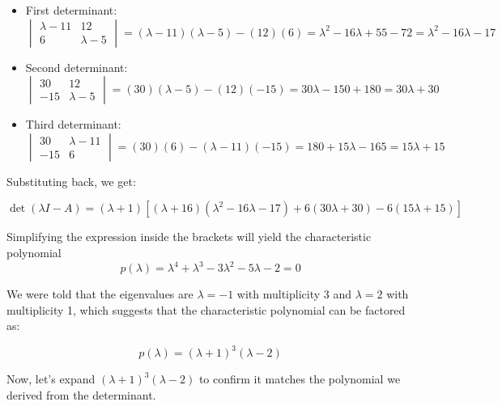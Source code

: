 \documentclass{article}
\begin{document}
\begin{itemize}
          \begin{itemize}
              \item First determinant:
                    \[
                        \begin{vmatrix} \lambda - 11 & 12 \\ 6 & \lambda - 5 \end{vmatrix} = (\lambda - 11)(\lambda - 5) - (12)(6) = \lambda^2 - 16\lambda + 55 - 72 = \lambda^2 - 16\lambda - 17
                    \]

              \item Second determinant:
                    \[
                        \begin{vmatrix} 30 & 12 \\ -15 & \lambda - 5 \end{vmatrix} = (30)(\lambda - 5) - (12)(-15) = 30\lambda - 150 + 180 = 30\lambda + 30
                    \]

              \item Third determinant:
                    \[
                        \begin{vmatrix} 30 & \lambda - 11 \\ -15 & 6 \end{vmatrix} = (30)(6) - (\lambda - 11)(-15) = 180 + 15\lambda - 165 = 15\lambda + 15
                    \]
          \end{itemize}

          Substituting back, we get:

          \[
              \det(\lambda I - A) = (\lambda + 1) \left[(\lambda + 16)(\lambda^2 - 16\lambda - 17) + 6(30\lambda + 30) - 6(15\lambda + 15)\right]
          \]

          Simplifying the expression inside the brackets will yield the characteristic polynomial
          \[
              p(\lambda) = \lambda^4 + \lambda^3 - 3\lambda^2 - 5\lambda - 2 = 0
          \]
\end{itemize}
We were told that the eigenvalues are \(\lambda = -1\) with multiplicity 3 and \(\lambda = 2\) with multiplicity 1, which suggests that the characteristic polynomial can be factored as:

\[
    p(\lambda) = (\lambda + 1)^3 (\lambda - 2)
\]

Now, let's expand \( (\lambda + 1)^3 (\lambda - 2) \) to confirm it matches the polynomial we derived from the determinant.
\end{document}
